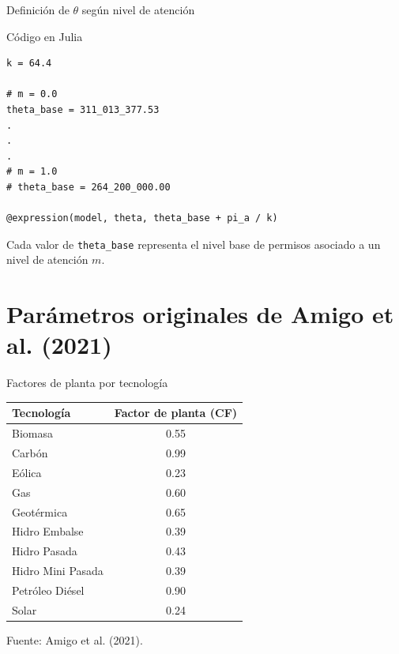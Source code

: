 \documentclass[xcolor=dvipsnames]{beamer}
\begin{document}
\begin{frame}[fragile]{Definición de $\theta$ según nivel de atención}

\small

\begin{block}{Código en Julia}
\begin{verbatim}
k = 64.4

# m = 0.0
theta_base = 311_013_377.53
.
.
.
# m = 1.0
# theta_base = 264_200_000.00

@expression(model, theta, theta_base + pi_a / k)
\end{verbatim}
\end{block}

\vspace{0.2cm}

\footnotesize{
Cada valor de \texttt{theta\_base} representa el nivel base de permisos
asociado a un nivel de atención \(m\).
}
\end{frame}



\section{Parámetros originales de Amigo et al. (2021)}

\begin{frame}{Factores de planta por tecnología}

\centering

\renewcommand{\arraystretch}{1.15}
\setlength{\tabcolsep}{12pt}

\begin{table}
\centering
\small
\begin{tabular}{l c}
\toprule
\textbf{Tecnología} & \textbf{Factor de planta (CF)} \\
\midrule
Biomasa           & 0.55 \\
Carbón            & 0.99 \\
Eólica            & 0.23 \\
Gas               & 0.60 \\
Geotérmica        & 0.65 \\
Hidro Embalse     & 0.39 \\
Hidro Pasada      & 0.43 \\
Hidro Mini Pasada & 0.39 \\
Petróleo Diésel   & 0.90 \\
Solar             & 0.24 \\
\bottomrule
\end{tabular}
\end{table}

\vspace{0.15cm}

{\footnotesize Fuente: Amigo et al. (2021).}

\end{frame}
\end{document}
